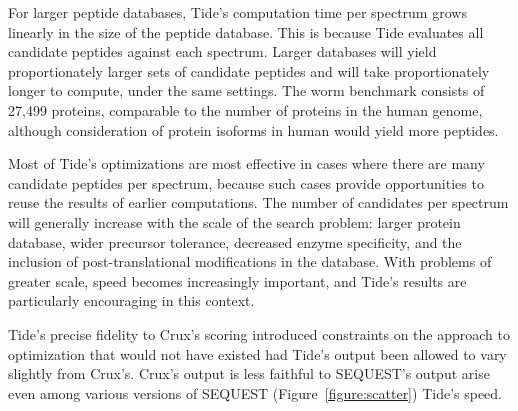 For larger peptide databases, Tide's computation time per spectrum
grows linearly in the size of the peptide database. This is because
Tide evaluates all candidate peptides against each spectrum. Larger
databases will yield proportionately larger sets of candidate peptides
and will take proportionately longer to compute, under the same
settings. The worm benchmark consists of 27,499 proteins, comparable
to the number of proteins in the human genome, although consideration
of protein isoforms in human would yield more peptides.

Most of Tide's optimizations are most effective in cases where there
are many candidate peptides per spectrum, because such cases provide
opportunities to reuse the results of earlier computations. The number
of candidates per spectrum will generally increase with the scale of
the search problem: larger protein database, wider
precursor tolerance, decreased enzyme specificity, and the inclusion
of post-translational modifications in the database. With
problems of greater scale, speed becomes increasingly important,
and Tide's results are particularly encouraging in this context.


Tide's precise fidelity to Crux's scoring introduced constraints on
the approach to optimization that would not have existed had Tide's
output been allowed to vary slightly from Crux's. \DIFdelbegin {}\DIFdelend \DIFaddbegin {}\DIFaddend Crux's output is less faithful to SEQUEST's output\DIFdelbegin {}%
\DIFdelend \DIFaddbegin {}\DIFaddend arise even among various versions of SEQUEST
(\DIFdelbegin {}\DIFdelend Figure~\ref{figure:scatter})\DIFdelbegin {}\DIFdelend \DIFaddbegin {}\cite{park:rapid} \DIFaddend Tide's speed\DIFdelbegin {}\DIFdelend .

